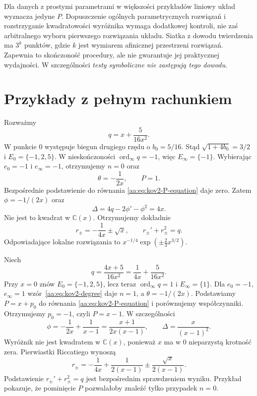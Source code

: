 \begin{uwaga}
\label{aa:uw:kov2-computation}
Dla danych z prostymi
parametrami w większości
przykładów liniowy układ
wyznacza jedyne $P$.
Dopuszczenie ogólnych
parametrycznych rozwiązań
i rozstrzyganie
kwadratowości wyróżnika
wymaga dodatkowej kontroli,
nie zaś arbitralnego
wyboru pierwszego
rozwiązania układu.
Siatka z dowodu twierdzenia
ma $3^k$ punktów, gdzie $k$
jest wymiarem afinicznej
przestrzeni rozwiązań.
Zapewnia to skończoność procedury,
ale nie gwarantuje jej
praktycznej wydajności.
W szczególności
\emph{testy symboliczne
nie zastępują tego dowodu}.
\end{uwaga}

\section{Przykłady z pełnym rachunkiem}

\begin{przyklad}
\label{aa:prz:kov2-zero-degree}
Rozważmy
\[
 q=x+\frac5{16x^2}.
\]
W punkcie $0$ występuje
biegun drugiego rzędu
o $b_0=5/16$.
Stąd
$\sqrt{1+4b_0}=3/2$
i $E_0=\{-1,2,5\}$.
W nieskończoności
$\operatorname{ord}_\infty q=-1$,
więc $E_\infty=\{-1\}$.
Wybierając $e_0=-1$
i $e_\infty=-1$,
otrzymujemy $n=0$ oraz
\[
 \theta=-\frac1{2x},\qquad P=1.
\]
Bezpośrednie podstawienie
do równania
\eqref{aa:eq:kov2-P-equation}
daje zero. Zatem
$\phi=-1/(2x)$ oraz
\[
 \Delta=4q-2\phi'-\phi^2=4x.
\]
Nie jest to kwadrat w
$\mathbb C(x)$.
Otrzymujemy dokładnie
\[
 r_\pm=-\frac1{4x}\pm\sqrt{x},
 \qquad r_\pm'+r_\pm^2=q.
\]
Odpowiadające
lokalne rozwiązania
to
$x^{-1/4}\exp(\pm\tfrac23 x^{3/2})$.
\end{przyklad}

\begin{przyklad}
\label{aa:prz:kov2-positive-degree}
Niech
\[
 q=\frac{4x+5}{16x^2}
   =\frac1{4x}+\frac5{16x^2}.
\]
Przy $x=0$ znów
$E_0=\{-1,2,5\}$,
lecz teraz
$\operatorname{ord}_\infty q=1$
i $E_\infty=\{1\}$.
Dla $e_0=-1$,
$e_\infty=1$
wzór~\eqref{aa:eq:kov2-degree}
daje $n=1$, a
$\theta=-1/(2x)$.
Podstawiamy
$P=x+p_0$ do równania
\eqref{aa:eq:kov2-P-equation}
i porównujemy współczynniki.
Otrzymujemy $p_0=-1$,
czyli $P=x-1$.
W szczególności
\[
 \phi=-\frac1{2x}+\frac1{x-1}
      =\frac{x+1}{2x(x-1)},
 \qquad
 \Delta=\frac{x}{(x-1)^2}.
\]
Wyróżnik nie jest
kwadratem w $\mathbb C(x)$,
ponieważ $x$ ma
w $0$ nieparzystą
krotność zera.
Pierwiastki Riccatiego wynoszą
\[
 r_\pm=-\frac1{4x}
       +\frac1{2(x-1)}
       \pm\frac{\sqrt{x}}{2(x-1)}.
\]
Podstawienie
$r_\pm'+r_\pm^2=q$
jest bezpośrednim
sprawdzeniem wyniku.
Przykład pokazuje,
że pominięcie $P$
pozwalałoby znaleźć
tylko przypadek $n=0$.
\end{przyklad}

